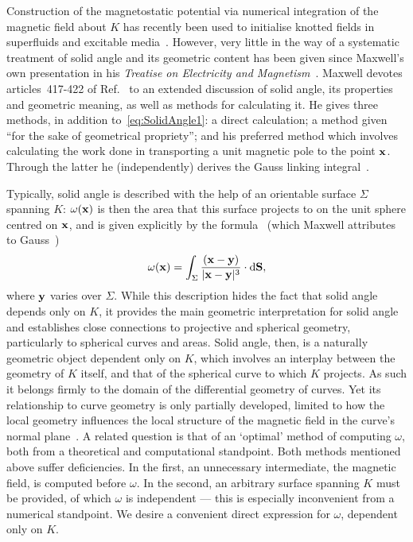     Construction of the magnetostatic potential via numerical integration of the magnetic field about $K$ has recently been used to initialise knotted fields in superfluids and excitable media~\citep{Kleckner2016,Maucher2016}. However, very little in the way of a systematic treatment of solid angle and its geometric content has been given since Maxwell's own presentation in his {\sl Treatise on Electricity and Magnetism}~\citep{Maxwell2}. Maxwell devotes articles~417-422 of Ref.~\citep{Maxwell2} to an extended discussion of solid angle, its properties and geometric meaning, as well as methods for calculating it. He gives three methods, in addition to~\eqref{eq:SolidAngle1}: a direct calculation; a method given ``for the sake of geometrical propriety''; and his preferred method which involves calculating the work done in transporting a unit magnetic pole to the point ${\bf x}$. Through the latter he (independently) derives the Gauss linking integral~\citep{Ricca2011}. 

    Typically, solid angle is described with the help of an orientable surface $\Sigma$ spanning $K$: $\omega({\bf x})$ is then the area that this surface projects to on the unit sphere centred on $\bf x$, and is given explicitly by the formula~\citep{Saffman1992} (which Maxwell attributes to Gauss~\citep[Art.~409]{Maxwell2})
    \begin{equation}
        \omega({\bf x}) = \int_{\Sigma} \frac{({\bf x}-{\bf y})}{|{\bf x}-{\bf y}|^3}\cdot \mathrm{d}{\bf S} ,
        \label{eq:SolidAngle1}
    \end{equation}
    where ${\bf y}$ varies over $\Sigma$. While this description hides the fact that solid angle depends only on $K$, it provides the main geometric interpretation for solid angle and establishes close connections to projective and spherical geometry, particularly to spherical curves and areas. Solid angle, then, is a naturally geometric object dependent only on $K$, which involves an interplay between the geometry of $K$ itself, and that of the spherical curve to which $K$ projects. As such it belongs firmly to the domain of the differential geometry of curves. Yet its relationship to curve geometry is only partially developed, limited to how the local geometry influences the local structure of the magnetic field in the curve's normal plane~\citep{Saffman1992,Moore1972,Ricca1994}. A related question is that of an `optimal' method of computing $\omega$, both from a theoretical and computational standpoint. Both methods mentioned above suffer deficiencies. In the first, an unnecessary intermediate, the magnetic field, is computed before $\omega$. In the second, an arbitrary surface spanning $K$ must be provided, of which $\omega$ is independent --- this is especially inconvenient from a numerical standpoint. We desire a convenient direct expression for $\omega$, dependent only on $K$. 

